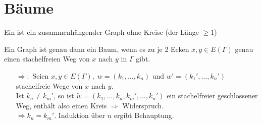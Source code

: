 \documentclass[a4paper, 10pt]{report}
\begin{document}
\section{Bäume}

\begin{Def}
Ein  ist ein zusammenhängender Graph ohne Kreise (der Länge $\ge 1$)
\end{Def}

\begin{Prop}
Ein Graph ist genau dann ein Baum, wenn es zu je 2 Ecken $x,y \in E(\Gamma)$
genau einen stachelfreien Weg von $x$ nach $y$ in $\Gamma$ gibt.
\end{Prop}
\begin{Bew}
\begin{itemize}
  \item[$\Rightarrow:$] Seien $x,y \in E(\Gamma), \; w = (k_1, \ldots, k_n)
  \textrm{ und } w' = (k_1', \ldots, k_n')$ stachelfreie Wege von $x$ nach $y$.\\
  Ist $k_n \not= k_m'$, so ist $\tilde{w} = (k_1, \ldots, k_n, k_m', \ldots,
  k_n')$ ein stachelfreier geschlossener Weg, enthält also einen Kreis
  $\Rightarrow$ Widerspruch.\\
  

  $\Rightarrow k_n = k_m'$. Induktion über $n$ ergibt Behauptung.
\end{itemize}

\end{Bew}
\end{document}
